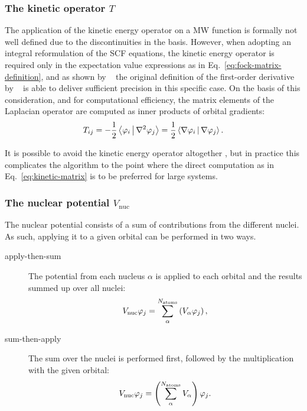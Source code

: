 \documentclass[journal=jctcce, manuscript=article]{achemso}
\begin{document}
\subsubsection{The kinetic operator $T$}
\label{sec:compute-T}
The application of the kinetic energy operator on a \ac{MW} function is formally not well defined due to the discontinuities in the basis.\cite{Anderson2019-bx} However, when adopting an integral reformulation of the \ac{SCF} equations, the kinetic energy operator is required only in the  expectation value expressions as in Eq.~\eqref{eq:fock-matrix-definition}, and as shown by \citeauthor{Anderson2019-bx}~\cite{Anderson2019-bx} the original definition of the first-order derivative by \citeauthor{Alpert:2002cx}~\cite{Alpert:2002cx} is able to deliver sufficient precision in this specific case. On the basis of this consideration, and for computational efficiency, the matrix elements of the Laplacian operator are computed as inner products of orbital gradients:
\begin{equation}
  \label{eq:kinetic-matrix}
  T_{ij} = 
  -\frac{1}{2} 
  \Braket{\varphi_i | \nabla^2 \varphi_j} 
  = 
  \frac{1}{2} 
  \Braket{\nabla \varphi_i | \nabla \varphi_j}.
\end{equation}

It is possible to avoid the kinetic energy operator altogether \cite{Jensen:2022gg}, but in practice this complicates the algorithm to the point where the direct computation as in Eq.~\eqref{eq:kinetic-matrix} is to be preferred for large systems.

\subsubsection{The nuclear potential $V_{\mathrm{nuc}}$}
\label{sec:compute-V}
The nuclear potential consists of a sum of contributions from the different nuclei. As such, applying it to a given orbital can be performed in two ways.

\begin{description}
\item[apply-then-sum] The potential from each nucleus $\alpha$ is applied to each orbital and the results summed up over all nuclei:
\begin{equation}
  V_{\mathrm{nuc}} \varphi_j = \sum_{\alpha}^{N_{\mathrm{atoms}}} \left(V_{\alpha} \varphi_j\right),
\end{equation} 
\item[sum-then-apply] The sum over the nuclei is performed first, followed by the multiplication with the given orbital:
\begin{equation}
V_{\mathrm{nuc}} \varphi_j = \left(\sum_{\alpha}^{N_{\mathrm{atoms}}} V_{\alpha}\right) \varphi_j.
\end{equation}
\end{description}
\end{document}
